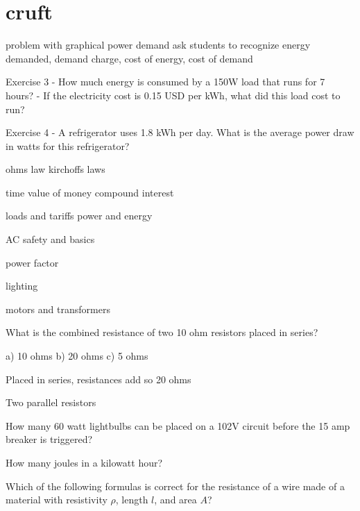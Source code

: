 \documentclass[12pt, oneside]{article}
\begin{document}
\newpage
\section{cruft}

problem with graphical power demand
ask students to recognize energy demanded, demand charge, cost of
energy, cost of demand

\problem{}

Exercise 3
- How much energy is consumed by a 150W load that runs for 7 hours?
- If the electricity cost is 0.15 USD per kWh, what did this load cost to run?

Exercise 4
- A refrigerator uses 1.8 kWh per day.  What is the average power draw
  in watts for this refrigerator?



ohms law kirchoffs laws


time value of money
compound interest


loads and tariffs
power and energy


AC
safety and basics


power factor


lighting


motors and transformers






What is the combined resistance of two 10 ohm resistors placed in
series?

a) 10 ohms
b) 20 ohms
c) 5 ohms


Placed in series, resistances add so 20 ohms


Two parallel resistors



How many 60 watt lightbulbs can be placed on a 102V circuit before the 15 amp
breaker is triggered?


How many joules in a kilowatt hour?


Which of the following formulas is correct for the resistance of a wire
made of a material with resistivity $\rho$, length $l$, and area $A$?
\end{document}
